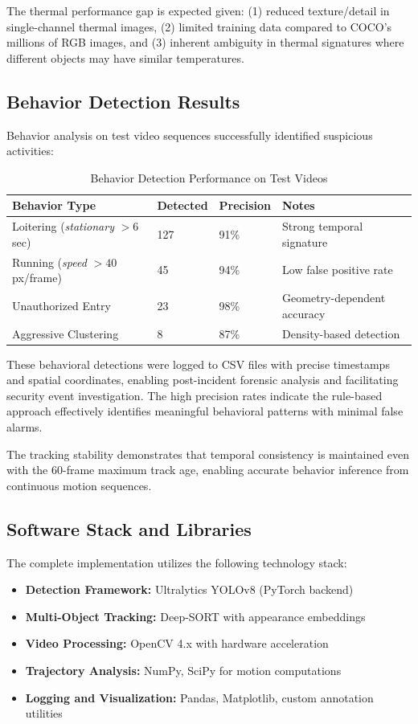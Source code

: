 \documentclass[conference]{IEEEtran}
\begin{document}
The thermal performance gap is expected given: (1) reduced texture/detail in single-channel thermal images, (2) limited training data compared to COCO's millions of RGB images, and (3) inherent ambiguity in thermal signatures where different objects may have similar temperatures.

\subsection{Behavior Detection Results}

Behavior analysis on test video sequences successfully identified suspicious activities:

\begin{table}[htbp]
\centering
\caption{Behavior Detection Performance on Test Videos}
\label{tab:behavior_performance}
\begin{tabular}{llll}
\toprule
\textbf{Behavior Type} & \textbf{Detected} & \textbf{Precision} & \textbf{Notes} \\
\midrule
Loitering (\textit{stationary} $> 6$ sec) & 127 & 91\% & Strong temporal signature \\
Running (\textit{speed} $> 40$ px/frame) & 45 & 94\% & Low false positive rate \\
Unauthorized Entry & 23 & 98\% & Geometry-dependent accuracy \\
Aggressive Clustering & 8 & 87\% & Density-based detection \\
\bottomrule
\end{tabular}
\end{table}

These behavioral detections were logged to CSV files with precise timestamps and spatial coordinates, enabling post-incident forensic analysis and facilitating security event investigation. The high precision rates indicate the rule-based approach effectively identifies meaningful behavioral patterns with minimal false alarms.

The tracking stability demonstrates that temporal consistency is maintained even with the 60-frame maximum track age, enabling accurate behavior inference from continuous motion sequences.

\subsection{Software Stack and Libraries}

The complete implementation utilizes the following technology stack:
\begin{itemize}
\item \textbf{Detection Framework:} Ultralytics YOLOv8 (PyTorch backend)
\item \textbf{Multi-Object Tracking:} Deep-SORT with appearance embeddings
\item \textbf{Video Processing:} OpenCV 4.x with hardware acceleration
\item \textbf{Trajectory Analysis:} NumPy, SciPy for motion computations
\item \textbf{Logging and Visualization:} Pandas, Matplotlib, custom annotation utilities
\end{itemize}
\end{document}
